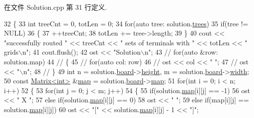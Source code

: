 在文件 Solution.\+cpp 第 31 行定义.


\begin{DoxyCode}
32 \{
33     \textcolor{keywordtype}{int} treeCnt = 0, totLen = 0;
34     \textcolor{keywordflow}{for}(\textcolor{keyword}{auto} tree: solution.\hyperlink{classSolution_a554205b5c578add14d2d7836042215d8}{trees})
35         \textcolor{keywordflow}{if}(tree != NULL)
36         \{
37             ++treeCnt;
38             totLen += tree->length;
39         \}
40     cout << \textcolor{stringliteral}{"successfully routed "} << treeCnt << \textcolor{stringliteral}{" sets of terminals with "} << totLen << \textcolor{stringliteral}{" grids\(\backslash\)n"};
41     cout.flush();
42     ost << \textcolor{stringliteral}{"Solution\(\backslash\)n"};
43     \textcolor{comment}{// for(auto &row: solution.map)}
44     \textcolor{comment}{// \{}
45         \textcolor{comment}{// for(auto col: row)}
46             \textcolor{comment}{// ost << col << " ";}
47         \textcolor{comment}{// ost << "\(\backslash\)n";}
48     \textcolor{comment}{// \}}
49     \textcolor{keywordtype}{int} n = solution.\hyperlink{classSolution_ac4f88cd3aa0713e8900f33eb9f1f15bf}{board}->\hyperlink{classBoard_aa0cb8de0254520dc08dab5796643c8e5}{height}, m = solution.\hyperlink{classSolution_ac4f88cd3aa0713e8900f33eb9f1f15bf}{board}->\hyperlink{classBoard_a90a8efaa4736af25511ac948bdd27d6c}{width};
50     \textcolor{keyword}{const} \hyperlink{classMatrix}{Matrix<int>} &\hyperlink{classSolution_ae89ccd74484f2c87afa05b16f8ee5bf6}{map} = solution.\hyperlink{classSolution_ac4f88cd3aa0713e8900f33eb9f1f15bf}{board}->\hyperlink{classBoard_a191ff45df9151b8fee0c32877f582165}{map};
51     \textcolor{keywordflow}{for}(\textcolor{keywordtype}{int} i = 0; i < n; i++)
52     \{
53         \textcolor{keywordflow}{for}(\textcolor{keywordtype}{int} j = 0; j < m; j++)
54         \{
55             \textcolor{keywordflow}{if}(solution.\hyperlink{classSolution_ae89ccd74484f2c87afa05b16f8ee5bf6}{map}[i][j] == -1)
56                 ost << \textcolor{stringliteral}{" X "};
57             \textcolor{keywordflow}{else} \textcolor{keywordflow}{if}(solution.\hyperlink{classSolution_ae89ccd74484f2c87afa05b16f8ee5bf6}{map}[i][j] == 0)
58                 ost << \textcolor{stringliteral}{"   "};
59             \textcolor{keywordflow}{else} \textcolor{keywordflow}{if}(map[i][j] == solution.\hyperlink{classSolution_ae89ccd74484f2c87afa05b16f8ee5bf6}{map}[i][j])
60                 ost << \textcolor{stringliteral}{"["} << solution.\hyperlink{classSolution_ae89ccd74484f2c87afa05b16f8ee5bf6}{map}[i][j] - 1 << \textcolor{stringliteral}{"]"};

\end{DoxyCode}
